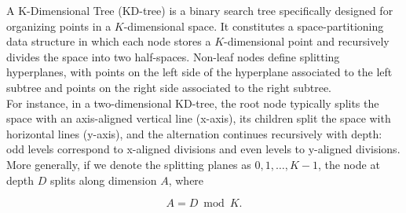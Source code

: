 A K-Dimensional Tree (KD-tree) is a binary search tree specifically designed for organizing points in a $K$-dimensional space. 
It constitutes a space-partitioning data structure in which each node stores a $K$-dimensional point and recursively divides the 
space into two half-spaces. Non-leaf nodes define splitting hyperplanes, with points on the left side of the hyperplane associated 
to the left subtree and points on the right side associated to the right subtree.  
\\
For instance, in a two-dimensional KD-tree, the root node typically splits the space with an axis-aligned vertical line (x-axis), 
its children split the space with horizontal lines (y-axis), and the alternation continues recursively with depth: odd levels 
correspond to x-aligned divisions and even levels to y-aligned divisions. More generally, if we denote the splitting planes 
as $0, 1, \dots, K-1$, the node at depth $D$ splits along dimension $A$, where

\[
    A = D \bmod K.
\]

